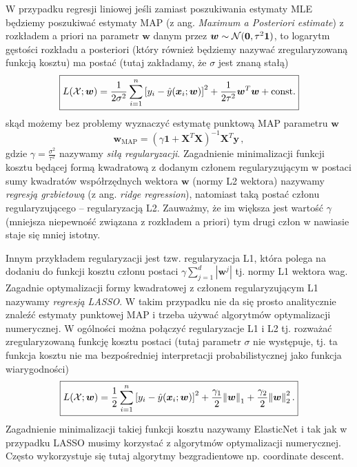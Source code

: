 \documentclass{myclass}
\numberwithin{equation}{subsection}
\begin{document}
W przypadku regresji liniowej jeśli zamiast poszukiwania estymaty MLE będziemy poszukiwać estymaty
MAP (z ang. \textit{Maximum a Posteriori estimate}) z rozkładem a priori na parametr \(\bm{w}\)
danym przez \(\bm{w} \sim \mathcal{N}(\bm{0}, \tau^{2}\bm{1})\), to logarytm gęstości rozkładu a
posteriori (który również będziemy nazywać zregularyzowaną funkcją kosztu) ma postać (tutaj
zakładamy, że \(\sigma\) jest znaną stałą)
\begin{equation}\boxed{
    L(\mathcal{X};\bm{w}) = \frac{1}{2\sigma^2}\sum_{i=1}^n\left[y_i - \hat{y}(\bm{x}_i;\bm{w})\right]^2 + \frac{1}{2\tau^2}\bm{w}^T\bm{w} + \mathrm{const.}
}\end{equation}
skąd możemy bez problemy wyznaczyć estymatę punktową MAP parametru \(\bm{w}\)
\begin{equation}
    \bm{w}_\mathrm{MAP} = \left(\gamma \bm{1} + \bm{X}^T\bm{X}\right)^{-1}\bm{X}^T\bm{y}\,,
\end{equation}
gdzie \(\gamma = \frac{\sigma^2}{\tau^2}\) nazywamy \emph{siłą regularyzacji}. Zagadnienie
minimalizacji funkcji kosztu będącej formą kwadratową z dodanym członem regularyzującym w postaci
sumy kwadratów współrzędnych wektora \(\bm{w}\) (normy L2 wektora) nazywamy \emph{regresją
grzbietową} (z ang. \textit{ridge regression}), natomiast taką postać członu regularyzującego --
regularyzacją L2. Zauważmy, że im większa jest wartość \(\gamma\) (mniejsza niepewność związana z
rozkładem a priori) tym drugi człon w nawiasie staje się mniej istotny.

Innym przykładem regularyzacji jest tzw. regularyzacja L1, która polega na dodaniu do funkcji kosztu
członu postaci \(\gamma \sum_{j=1}^d |\bm{w}^j|\) tj. normy L1 wektora wag. Zagadnie optymalizacji
formy kwadratowej z członem regularyzującym L1 nazywamy \emph{regresją LASSO}. W takim przypadku nie
da się prosto analitycznie znaleźć estymaty punktowej MAP i trzeba używać algorytmów optymalizacji
numerycznej. W ogólności można połączyć regularyzacje L1 i L2 tj. rozważać zregularyzowaną funkcję
kosztu postaci (tutaj parametr \(\sigma\) nie występuje, tj. ta funkcja kosztu nie ma bezpośredniej
interpretacji probabilistycznej jako funkcja wiarygodności)
\begin{equation}\boxed{
    L(\mathcal{X};\bm{w}) = \frac{1}{2}\sum_{i=1}^n \left[y_i - \hat{y}(\bm{x}_i;\bm{w})\right]^2 + \frac{\gamma_1}{2}\norm{\bm{w}}_1 +  \frac{\gamma_2}{2}\norm{\bm{w}}_2^2\,.
}\end{equation}
Zagadnienie minimalizacji takiej funkcji kosztu nazywamy ElasticNet i tak jak w przypadku LASSO
musimy korzystać z algorytmów optymalizacji numerycznej. Często wykorzystuje się tutaj algorytmy
bezgradientowe np. coordinate descent.
\end{document}
